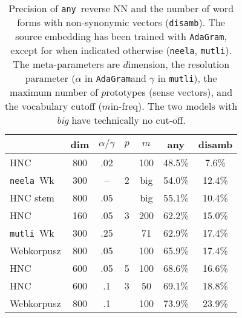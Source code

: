 \documentclass[11pt]{article}
\newcommand{\neelakantan}{\texttt{neela}}
\newcommand{\adagram}{\texttt{AdaGram}}
\newcommand{\mutli}{\texttt{mutli}}
\newcommand{\any}{\texttt{any}}
\newcommand{\disamb}{\texttt{disamb}}
\begin{document}
\begin{table}
  \centering\small
    \begin{tabular}{lcccc|cc}
      \toprule
        & dim & $\alpha/\gamma$ & $p$ & $m$ & any & disamb \\
      \midrule
      HNC	        & 800	& .02	&       & 100   & 48.5\%	&  7.6\% \\
      \neelakantan~Wk&300&--&2   &big  & 54.0\%	&  12.4\% \\
      HNC stem & 800	& .05	&       &  big & 55.1\%	&  10.4\% \\
      HNC         & 160 & .05 & 3     & 200   & 62.2\%	&  15.0\% \\
      \mutli~Wk &300&.25 &       & 71    & 62.9\%	&  17.4\% \\
      Webkorpusz	    & 800	& .05	&       & 100	  & 65.9\%	&  17.4\% \\
      HNC	        & 600	& .05	& 5     & 100	  & 68.6\%	&  16.6\% \\
      HNC	        & 600	& .1  & 3     & 50	  & 69.1\%	&  18.8\% \\
      Webkorpusz	    & 800	& .1  &       & 100	  & 73.9\%	&  23.9\% \\
      \bottomrule 
    \end{tabular}
  \caption{Precision of \any~reverse NN and the number of word forms with
  non-synonymic vectors (\disamb).  The source embedding has been trained with
  \adagram, except for when indicated otherwise (\neelakantan, \mutli).  The
  meta-parameters are $d$imension, the resolution parameter ($\alpha$ in
  \adagram and $\gamma$ in \mutli), the maximum number of $p$rototypes (sense
  vectors), and the vocabulary cutoff ($m$in-freq). The two models with
  \emph{big} have technically no cut-off.}
    \label{tab:prec}
\end{table}
\end{document}
